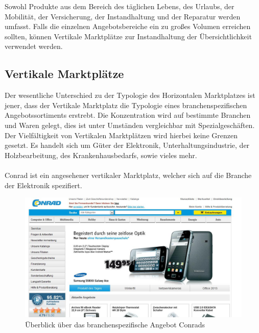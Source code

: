 \documentclass[11pt,a4paper]{article}
\begin{document}
\noindent Sowohl Produkte aus dem Bereich des täglichen Lebens, des Urlaubs, der Mobilität, der Versicherung, der Instandhaltung und der Reparatur werden umfasst. Falls die einzelnen Angebotsbereiche ein zu großes Volumen erreichen sollten, können Vertikale Marktplätze zur Instandhaltung der Übersichtlichkeit verwendet werden.
\newpage
\subsection{Vertikale Marktplätze}
Der wesentliche Unterschied zu der Typologie des Horizontalen Marktplatzes ist jener, dass der Vertikale Marktplatz die Typologie eines branchenspezifischen Angebotssortiments erstrebt. Die Konzentration wird auf bestimmte Branchen und Waren gelegt, dies ist unter Umständen vergleichbar mit Spezialgeschäften. Der Vielfältigkeit von Vertikalen Marktplätzen wird hierbei keine Grenzen gesetzt. Es handelt sich um Güter der Elektronik, Unterhaltungsindustrie, der Holzbearbeitung, des Krankenhausbedarfs, sowie vieles mehr. \\ \\

\noindent Conrad ist ein angesehener vertikaler Marktplatz, welcher sich auf die Branche der Elektronik spezifiert.

\begin{figure}[ht!]
	\centering
	\includegraphics[width=180mm]{conrad}
	\caption{Überblick über das branchenspezifische Angebot Conrads \label{conrad}}
\end{figure}
\end{document}
